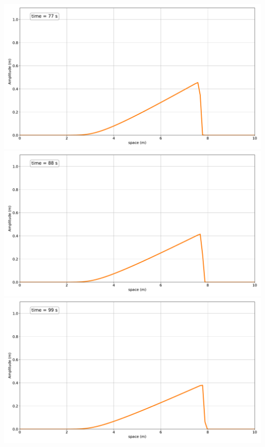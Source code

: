 \includegraphics[width=\linewidth]{../BurgersEquation/images/Nonlinear_Convection7.pdf}
\includegraphics[width=\linewidth]{../BurgersEquation/images/Nonlinear_Convection8.pdf}
\includegraphics[width=\linewidth]{../BurgersEquation/images/Nonlinear_Convection9.pdf}



